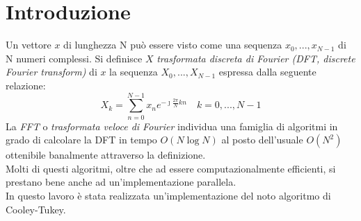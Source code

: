 \documentclass[12pt,a4paper,oneside,openright]{article}
\title{}
\begin{document}



\section*{Introduzione}
Un vettore $x$ di lunghezza N può essere visto come una sequenza $x_0,...,x_{N-1}$ di N numeri complessi. Si definisce $X$ \emph{trasformata discreta di Fourier (DFT, discrete Fourier transform)}  di $x$ la sequenza $X_0,...,X_{N-1}$ espressa dalla seguente relazione:
\begin{equation*}
\label{eq:def-dft}
X_k=\sum_{n=0}^{N-1}x_ne^{-\jmath\frac{2\pi}{N}kn} \quad k=0,...,N-1
\end{equation*}
La \emph{FFT} o \emph{trasformata veloce di Fourier} individua una famiglia di algoritmi in grado di calcolare la DFT in tempo $O(N \log N)$ al posto dell'usuale $O(N^{2})$ ottenibile banalmente attraverso la definizione.\\
Molti di questi algoritmi, oltre che ad essere computazionalmente efficienti, si prestano bene anche ad un'implementazione parallela.\\
In questo lavoro è stata realizzata un'implementazione del noto algoritmo di Cooley-Tukey.
\end{document}
